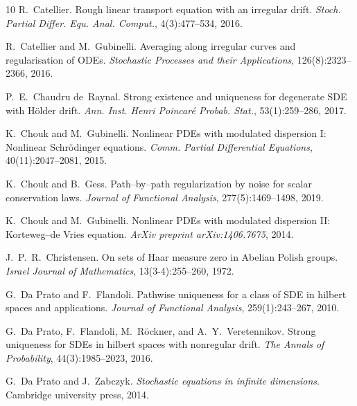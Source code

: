 \documentclass[10pt]{article}
\newcommand{\tmtextit}[1]{{\itshape{#1}}}
\begin{document}
\begin{thebibliography}{10}
  R.~Catellier. {\newblock}Rough linear transport
  equation with an irregular drift. {\newblock}\tmtextit{Stoch. Partial
  Differ. Equ. Anal. Comput.}, 4(3):477--534, 2016.{\newblock}
  
  R.~Catellier  and  M.~Gubinelli.
  {\newblock}Averaging along irregular curves and regularisation of ODEs.
  {\newblock}\tmtextit{Stochastic Processes and their Applications},
  126(8):2323--2366, 2016.{\newblock}
  
  P.~E.~Chaudru de~Raynal. {\newblock}Strong existence
  and uniqueness for degenerate SDE with H{\"o}lder drift.
  {\newblock}\tmtextit{Ann. Inst. Henri Poincar{\'e} Probab. Stat.},
  53(1):259--286, 2017.{\newblock}
  
  K.~Chouk  and  M.~Gubinelli.
  {\newblock}Nonlinear PDEs with modulated dispersion I: Nonlinear
  Schr{\"o}dinger equations. {\newblock}\tmtextit{Comm. Partial Differential
  Equations}, 40(11):2047--2081, 2015.{\newblock}
  
  K.~Chouk  and  B.~Gess. {\newblock}Path--by--path
  regularization by noise for scalar conservation laws.
  {\newblock}\tmtextit{Journal of Functional Analysis}, 277(5):1469--1498,
  2019.{\newblock}
  
  K.~Chouk  and  M.~Gubinelli.
  {\newblock}Nonlinear PDEs with modulated dispersion II: Korteweg--de Vries
  equation. {\newblock}\tmtextit{ArXiv preprint arXiv:1406.7675},
  2014.{\newblock}
  
  J.~P.~R.~Christensen. {\newblock}On sets of Haar
  measure zero in Abelian Polish groups. {\newblock}\tmtextit{Israel Journal
  of Mathematics}, 13(3-4):255--260, 1972.{\newblock}
  
  G.~Da Prato  and  F.~Flandoli.
  {\newblock}Pathwise uniqueness for a class of SDE in hilbert spaces and
  applications. {\newblock}\tmtextit{Journal of Functional Analysis},
  259(1):243--267, 2010.{\newblock}
  
  G.~Da Prato, F.~Flandoli, M.~R{\"o}ckner, and 
  A.~Y.~Veretennikov. {\newblock}Strong uniqueness for SDEs in hilbert spaces
  with nonregular drift. {\newblock}\tmtextit{The Annals of Probability},
  44(3):1985--2023, 2016.{\newblock}
  
  G.~Da Prato  and  J.~Zabczyk.
  {\newblock}\tmtextit{Stochastic equations in infinite dimensions}.
  {\newblock}Cambridge university press, 2014.{\newblock}
  

\end{thebibliography}
\end{document}
